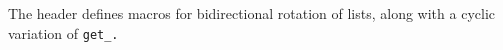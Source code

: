 The header  defines macros for bidirectional rotation of lists,
along with a cyclic variation of \tt{get_}.

\subsubsection{}


\subsubsection{}


\subsubsection{}


\subsubsection{}

